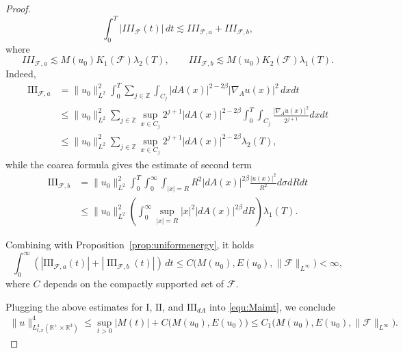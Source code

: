 \documentclass[10pt%
]{amsart}
\numberwithin{equation}{section}
\newcommand{\R}{\mathbb{R}}
\theoremstyle{definition}
\newcommand{\Fcurv}{\mathcal{F}}
\begin{document}
\begin{proof}
\[
\int_0^T |III_{\Fcurv}(t)|\,dt \lesssim III_{{\Fcurv},a}+III_{{\Fcurv},b},
\]
where
\[
III_{{\Fcurv},a} \lesssim M(u_0)K_1({\Fcurv})\lambda_2(T),
\qquad
III_{{\Fcurv},b} \lesssim M(u_0)K_2({\Fcurv})\lambda_1(T).
\]
	Indeed,
\begin{align*}
\operatorname{III}_{{\Fcurv},a} &= \|u_0\|_{L^2}^2 \int_0^T \sum_{j \in \mathbb{Z}} \int_{C_j} |dA(x)|^{2-2\beta} |\nabla_A u(x)|^2 \, dx dt \\
&\le \|u_0\|_{L^2}^2 \sum_{j \in \mathbb{Z}} \sup_{x \in C_j} 2^{j+1} |dA(x)|^{2-2\beta} \int_0^T \int_{C_j} \frac{|\nabla_A u(x)|^2}{2^{j+1}} dx dt \\
&\le \|u_0\|_{L^2}^2 \sum_{j \in \mathbb{Z}} \sup_{x \in C_j} 2^{j+1} |dA(x)|^{2-2\beta} \lambda_2(T),
\end{align*}
	while the coarea formula gives the estimate of second term
\begin{align*}
    \operatorname{III}_{{\Fcurv},b} &= \|u_0\|_{L^2}^2 \int_0^T \int_0^\infty \int_{|x|=R} R^2 |dA(x)|^{2\beta} \frac{|u(x)|^2}{R^2} d\sigma dR dt \\
&\le \|u_0\|_{L^2}^2 \left( \int_0^\infty \sup_{|x|=R} |x|^2 |dA(x)|^{2\beta} dR \right) \lambda_1(T).
\end{align*}

Combining with Proposition~\ref{prop:uniformenergy}, it holds
	\begin{equation}\label{equ:III-L1}
	\int_0^\infty(|\mathrm{III}_{{\Fcurv},a}(t)|+|\operatorname{III}_{{\Fcurv},b}(t)|)\,dt
	\le C\big(M(u_0),E(u_0),\|\Fcurv\|_{L^\infty}\big)<\infty,
	\end{equation}
    where $C$ depends on the  compactly supported set of $\Fcurv$.

	Plugging the above estimates for $\mathrm I$, $\mathrm{II}$, and $\mathrm{III}_{dA}$ into \eqref{equ:Maimt}, we conclude
	\begin{align*}
		\big\|u\big\|_{L_{t,x}^4(\R^+\times\R^3)}^4\leq \sup_{t>0}\big| M(t)\big|+ C\big(M(u_0),E(u_0)\big)\leq C_1\big(M(u_0),E(u_0),\|\Fcurv\|_{L^\infty}\big).
	\end{align*}
\end{proof}
\end{document}
